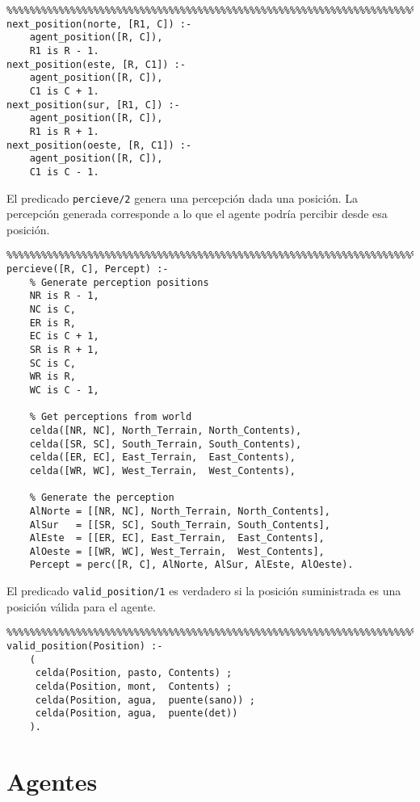 \documentclass[a4paper,12pt]{report}
\begin{document}
\begin{verbatim}
%%%%%%%%%%%%%%%%%%%%%%%%%%%%%%%%%%%%%%%%%%%%%%%%%%%%%%%%%%%%%%%%%%%%%%%%%%%%%%%%
next_position(norte, [R1, C]) :-
    agent_position([R, C]),
    R1 is R - 1.
next_position(este, [R, C1]) :-
    agent_position([R, C]),
    C1 is C + 1.
next_position(sur, [R1, C]) :-
    agent_position([R, C]),
    R1 is R + 1.
next_position(oeste, [R, C1]) :-
    agent_position([R, C]),
    C1 is C - 1.

\end{verbatim}

El predicado \texttt{percieve/2} genera una percepci\'{o}n dada una posici\'{o}n.
La percepci\'{o}n generada corresponde a lo que el agente podr\'{i}a percibir desde esa posici\'{o}n.

\begin{verbatim}
%%%%%%%%%%%%%%%%%%%%%%%%%%%%%%%%%%%%%%%%%%%%%%%%%%%%%%%%%%%%%%%%%%%%%%%%%%%%%%%%
percieve([R, C], Percept) :-
    % Generate perception positions
    NR is R - 1,
    NC is C,
    ER is R,
    EC is C + 1,
    SR is R + 1,
    SC is C,
    WR is R,
    WC is C - 1,

    % Get perceptions from world
    celda([NR, NC], North_Terrain, North_Contents),
    celda([SR, SC], South_Terrain, South_Contents),
    celda([ER, EC], East_Terrain,  East_Contents),
    celda([WR, WC], West_Terrain,  West_Contents),

    % Generate the perception
    AlNorte = [[NR, NC], North_Terrain, North_Contents],
    AlSur   = [[SR, SC], South_Terrain, South_Contents],
    AlEste  = [[ER, EC], East_Terrain,  East_Contents],
    AlOeste = [[WR, WC], West_Terrain,  West_Contents],
    Percept = perc([R, C], AlNorte, AlSur, AlEste, AlOeste).

\end{verbatim}

El predicado \texttt{valid\_position/1} es verdadero si la posici\'{o}n suministrada es una posici\'{o}n v\'{a}lida
para el agente.

\begin{verbatim}
%%%%%%%%%%%%%%%%%%%%%%%%%%%%%%%%%%%%%%%%%%%%%%%%%%%%%%%%%%%%%%%%%%%%%%%%%%%%%%%%
valid_position(Position) :-
    (
     celda(Position, pasto, Contents) ;
     celda(Position, mont,  Contents) ;
     celda(Position, agua,  puente(sano)) ;
     celda(Position, agua,  puente(det))
    ).

\end{verbatim}

\section{Agentes}
\end{document}
